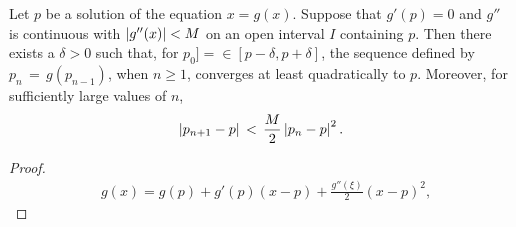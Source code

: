 \begin{theo}
Let $p$ be a solution of the equation $x=g(x)$. Suppose that $g'(p)=0$ and $g''$ is continuous with $\left|g''(x)\right|<M$ on an open interval $I$ containing $p$. Then there exists a $\delta>0$ such that, for $p_0]=\in [p-\delta,p+\delta]$, the sequence defined by $p_n\,=\,g(p_{n-1})$, when $n\geq 1$, converges at least quadratically to $p$. Moreover, for sufficiently large values of $n$,
\[
\left|p_{n+1}-p\right|\,<\,\frac{M}{2}\left|p_n-p\right|^2.
\]
\end{theo}
\begin{proof}
\begin{align*}
& g(x)=g(p)+g'(p)(x-p)+\frac{g''(\xi)}{2}(x-p)^2,
\end{align*}
\end{proof}
















